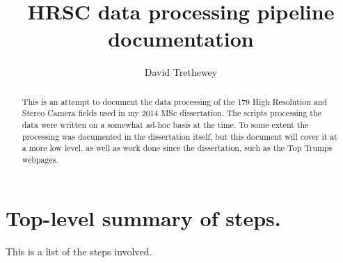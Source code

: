 \documentclass[a4paper,12pt]{article}
\title{HRSC data processing pipeline documentation}
\author{David Trethewey}
\begin{document}
\maketitle

\begin{abstract}
This is an attempt to document the data processing of the 179 High Resolution 
and Stereo Camera fields used in my 2014 MSc dissertation. The scripts processing the data were written on 
a somewhat ad-hoc basis at the time. To some extent the processing was documented in the dissertation itself, but this document will cover it at a more low level, as well as work done since the dissertation, such as the Top Trumps webpages.
\end{abstract}

\section{Top-level summary of steps.}
This is a list of the steps involved.
\end{document}
